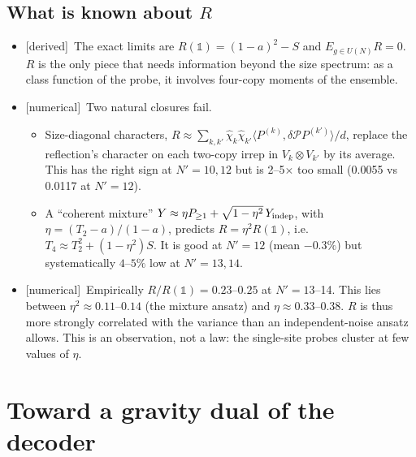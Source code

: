 \documentclass[11pt]{article}
\newcommand{\Np}{N'}
\newcommand{\one}{\mathds 1}
\newcommand{\tagbox}[2]{\textsf{\small\color{#1}[#2]}}
\newcommand{\DER}{\tagbox{cder}{derived}}
\newcommand{\NUM}{\tagbox{cnum}{numerical}}
\theoremstyle{remark}
\begin{document}
\subsection{What is known about $R$}
\begin{itemize}\itemsep1pt
\item \DER\ The exact limits are $R(\one)=(1-a)^2-S$ and $E_{g\in U(N)}R=0$. $R$ is the only piece that needs
  information beyond the size spectrum: as a class function of the probe, it involves four-copy moments of the
  ensemble.
\item \NUM\ Two natural closures fail.
  \begin{itemize}\itemsep1pt
  \item Size-diagonal characters, $R\approx\sum_{k,k'}\hat\chi_k\hat\chi_{k'}\langle P^{(k)},\delta\mathcal PP^{(k')}\rangle/d$,
    replace the reflection's character on each two-copy irrep in $V_k\otimes V_{k'}$ by its average. This has the
    right sign at $\Np=10,12$ but is 2--5$\times$ too small (0.0055 vs 0.0117 at $\Np=12$).
  \item A ``coherent mixture'' $Y\approx\eta P_{\ge1}+\sqrt{1-\eta^2}\,Y_{\rm indep}$, with $\eta=(T_2-a)/(1-a)$,
    predicts $R=\eta^2R(\one)$, i.e.\ $T_4\approx T_2^2+(1-\eta^2)S$. It is good at $\Np=12$ (mean $-0.3\%$) but
    systematically $4$--$5\%$ low at $\Np=13,14$.
  \end{itemize}
\item \NUM\ Empirically $R/R(\one)=0.23$--$0.25$ at $\Np=13$--14. This lies between $\eta^2\approx0.11$--$0.14$ (the
  mixture ansatz) and $\eta\approx0.33$--$0.38$. $R$ is thus more strongly correlated with the variance than an
  independent-noise ansatz allows. This is an observation, not a law: the single-site probes cluster at few values
  of $\eta$.
\end{itemize}

\section{Toward a gravity dual of the decoder}\label{sec:gravity}
\end{document}
